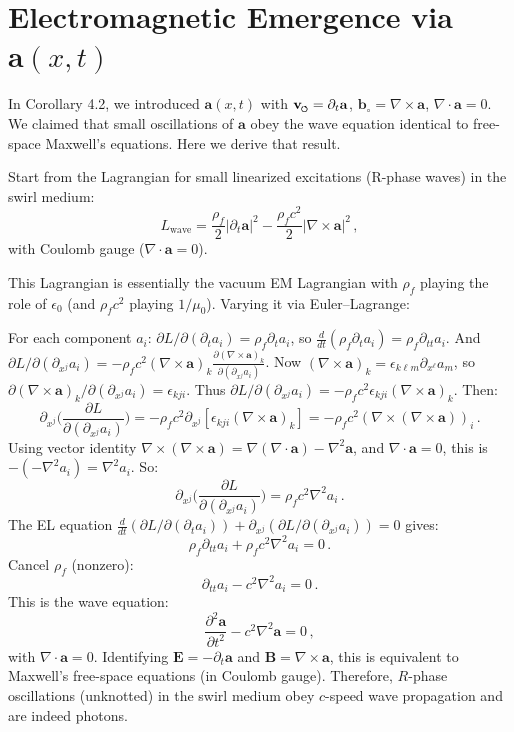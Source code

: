 \documentclass[reprint,aps,onecolumn,nofootinbib]{revtex4-2}
\newcommand{\swirlarrow}{%
    \mathchoice{\mkern-2mu\scriptstyle\boldsymbol{\circlearrowleft}}%
    {\mkern-2mu\scriptstyle\boldsymbol{\circlearrowleft}}%
    {\mkern-2mu\scriptscriptstyle\boldsymbol{\circlearrowleft}}%
    {\mkern-2mu\scriptscriptstyle\boldsymbol{\circlearrowleft}}%
}
\newcommand{\vswirl}{\mathbf{v}_{\swirlarrow}}
\begin{document}
	\section{Electromagnetic Emergence via $\mathbf{a}(x,t)$}
	In Corollary 4.2, we introduced $\mathbf{a}(x,t)$ with $\vswirl = \partial_t \mathbf{a}$, $\mathbf{b}_{\circ} = \nabla \times \mathbf{a}$, $\nabla \cdot \mathbf{a}=0$. We claimed that small oscillations of $\mathbf{a}$ obey the wave equation identical to free-space Maxwell’s equations. Here we derive that result.

	Start from the Lagrangian for small linearized excitations (R-phase waves) in the swirl medium:
	\[
		L_{\text{wave}} = \frac{\rho_f}{2}|\partial_t \mathbf{a}|^2 - \frac{\rho_f c^2}{2}|\nabla \times \mathbf{a}|^2\,,
	\]
	with Coulomb gauge ($\nabla \cdot \mathbf{a}=0$).

	This Lagrangian is essentially the vacuum EM Lagrangian with $\rho_f$ playing the role of $\epsilon_0$ (and $\rho_f c^2$ playing $1/\mu_0$). Varying it via Euler–Lagrange:

	For each component $a_i$: $\partial L/\partial(\partial_t a_i) = \rho_f \partial_t a_i$, so $\frac{d}{dt}(\rho_f \partial_t a_i) = \rho_f \partial_{tt} a_i$. And $\partial L/\partial(\partial_{x^j} a_i) = -\rho_f c^2 (\nabla \times \mathbf{a})_k \frac{\partial (\nabla \times \mathbf{a})_k}{\partial(\partial_{x^j}a_i)}$. Now $(\nabla \times \mathbf{a})_k = \epsilon_{k\ell m}\partial_{x^\ell} a_m$, so $\partial(\nabla \times \mathbf{a})_k/\partial(\partial_{x^j}a_i) = \epsilon_{kji}$. Thus $\partial L/\partial(\partial_{x^j} a_i) = -\rho_f c^2 \epsilon_{kji}(\nabla \times \mathbf{a})_k$. Then:
	\[
		\partial_{x^j}\Big(\frac{\partial L}{\partial(\partial_{x^j} a_i)}\Big) = -\rho_f c^2 \partial_{x^j}[\epsilon_{kji}(\nabla \times \mathbf{a})_k] = -\rho_f c^2 (\nabla \times (\nabla \times \mathbf{a}))_i\,.
	\]
	Using vector identity $\nabla \times (\nabla \times \mathbf{a}) = \nabla(\nabla\cdot\mathbf{a}) - \nabla^2 \mathbf{a}$, and $\nabla\cdot\mathbf{a}=0$, this is $-(-\nabla^2 a_i) = \nabla^2 a_i$. So:
	\[
		\partial_{x^j}\Big(\frac{\partial L}{\partial(\partial_{x^j} a_i)}\Big) = \rho_f c^2 \nabla^2 a_i\,.
	\]
	The EL equation $\frac{d}{dt}(\partial L/\partial(\partial_t a_i)) + \partial_{x^j}(\partial L/\partial(\partial_{x^j}a_i))=0$ gives:
	\[
		\rho_f \partial_{tt} a_i + \rho_f c^2 \nabla^2 a_i = 0\,.
	\]
	Cancel $\rho_f$ (nonzero):
	\[
		\partial_{tt} a_i - c^2 \nabla^2 a_i = 0\,.
	\]
	This is the wave equation:
	\[
		\frac{\partial^2 \mathbf{a}}{\partial t^2} - c^2 \nabla^2 \mathbf{a} = 0\,,
	\]
	with $\nabla\cdot\mathbf{a}=0$. Identifying $\mathbf{E} = -\partial_t \mathbf{a}$ and $\mathbf{B}=\nabla\times\mathbf{a}$, this is equivalent to Maxwell’s free-space equations (in Coulomb gauge). Therefore, $R$-phase oscillations (unknotted) in the swirl medium obey $c$-speed wave propagation and are indeed photons.
\end{document}
